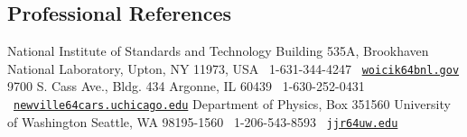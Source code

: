 \documentclass[11pt]{moderncv}
\begin{document}
\subsection{Professional References}
%
{National Institute of Standards and Technology\newline
  Building 535A, Brookhaven National Laboratory, Upton, NY 11973, USA\newline
  \phonesymbol\ 1-631-344-4247\quad
  \emailsymbol\ \href{mailto:woicik@bnl.gov}{\footnotesize\texttt{woicik\char64bnl.gov}}}
%
{9700 S. Cass Ave., Bldg. 434\newline
Argonne, IL 60439\newline
\phonesymbol\ 1-630-252-0431\quad
\emailsymbol\ \href{mailto:newville@cars.uchicago.edu}{\footnotesize\texttt{newville\char64cars.uchicago.edu}}}
%
{Department of Physics, Box 351560\newline
University of Washington\newline
Seattle, WA 98195-1560\newline
\phonesymbol\ 1-206-543-8593\quad
\emailsymbol\ \href{mailto:jjr@uw.edu}{\footnotesize\texttt{jjr\char64uw.edu}}}


\nocite{*}


\end{document}
